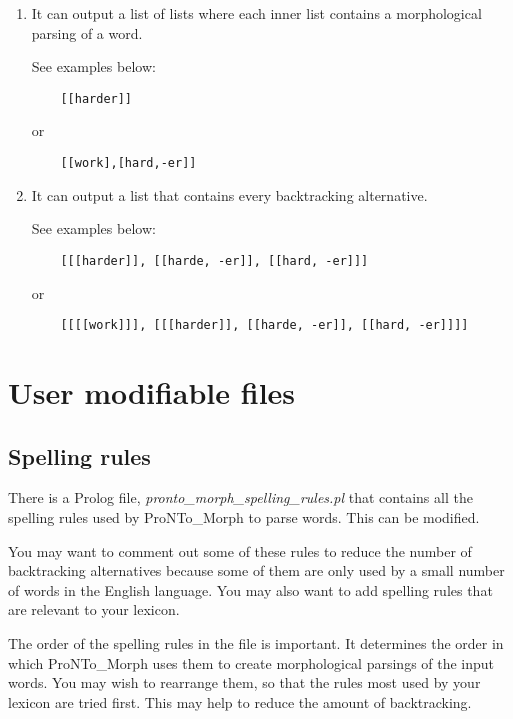 \begin{enumerate}
    \item It can output a list of lists where each inner list
    contains a morphological parsing of a word.

    See examples below:
    \begin{verbatim}
    [[harder]]\end{verbatim} or
    \begin{verbatim}
    [[work],[hard,-er]]\end{verbatim}

    \item It can output a list that contains every backtracking
    alternative.

    See examples below:
    \begin{verbatim}
    [[[harder]], [[harde, -er]], [[hard, -er]]]\end{verbatim} or
    \begin{verbatim}
    [[[[work]]], [[[harder]], [[harde, -er]], [[hard, -er]]]]\end{verbatim}

\end{enumerate}

\section{User modifiable files}

\subsection{Spelling rules}

There is a Prolog file, \emph{pronto\_morph\_spelling\_rules.pl}
that contains all the spelling rules used by ProNTo\_Morph to
parse words.  This can be modified.\newline

You may want to comment out some of these rules to reduce the
number of backtracking alternatives because some of them are only
used by a small number of words in the English language.  You may
also want to add spelling rules that are relevant to your
lexicon.\newline

The order of the spelling rules in the file is important. It
determines the order in which ProNTo\_Morph uses them to create
morphological parsings of the input words. You may wish to
rearrange them, so that the rules most used by your lexicon are
tried first.  This may help to reduce the amount of backtracking.

